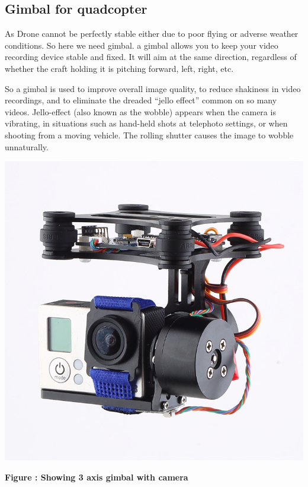 \documentclass[11pt,a4paper]{article}
\begin{document}
		\subsection{Gimbal for quadcopter}
		As Drone cannot be perfectly stable either due to poor flying or adverse weather conditions. So here we need gimbal. a gimbal allows you to keep your video recording device stable and fixed. It will aim at the same direction, regardless of whether the craft holding it is pitching forward, left, right, etc.
		\par So a gimbal is used to improve overall image quality, to reduce shakiness in video recordings, and to eliminate the dreaded “jello effect” common on so many videos. Jello-effect (also known as the wobble) appears when the camera is vibrating, in situations such as hand-held shots at telephoto settings, or when shooting from a moving vehicle. The rolling shutter causes the image to wobble unnaturally.
		\newline
		\newline
		\begin{center}
			\includegraphics[scale=0.4]{3_Axis_Gimbal_Example.jpg}
		\end{center}
		\begin{center}
			\textbf{Figure : Showing 3 axis gimbal with camera}
		\end{center}
		
\end{document}
